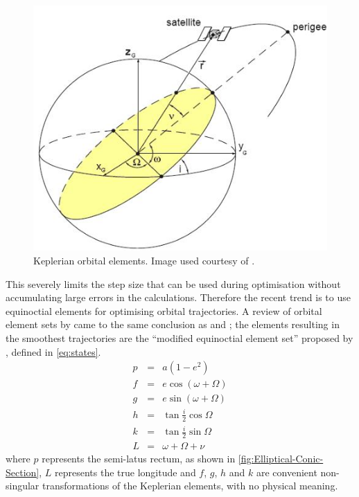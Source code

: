 \begin{figure} [h]
\begin{center}
\includegraphics[scale=0.75]{Images/Keplerian-elements.JPG}
\end{center}
\caption{Keplerian orbital elements. Image used courtesy of \textcite{Keppeler_thesis}.}
\label{fig:Keplerian-Orbital-Elements}
\end{figure}

This severely limits the step size that can be used during optimisation without accumulating large errors in the calculations. Therefore the recent trend is to use equinoctial elements for optimising orbital trajectories. A review of orbital element sets by \textcite{Hintz2008} came to the same conclusion as \citeauthor{Letterio_thesis} and \citeauthor{Keppeler_thesis}; the elements resulting in the smoothest trajectories are the \enquote{modified equinoctial element set} proposed by \textcite{Walker1985}, defined in \eqref{eq:states}.
\begin{subequations}\label{eq:states}
\begin{eqnarray}
p & = & a(1-e^{2}) \label{eq:p}\\
f & = & e\cos(\omega+\Omega) \label{eq:f}\\
g & = & e\sin(\omega+\Omega) \label{eq:g}\\
h & = & \tan\frac{i}{2}\cos\Omega \label{eq:h}\\
k & = & \tan\frac{i}{2}\sin\Omega \label{eq:k}\\
L & = & \omega+\Omega+\nu \label{eq:L}
\end{eqnarray}
\end{subequations}
where $p$ represents the semi-latus rectum, as shown in \autoref{fig:Elliptical-Conic-Section}, $L$ represents the true longitude and $f$, $g$, $h$ and $k$ are convenient non-singular transformations of the Keplerian elements, with no physical meaning.

